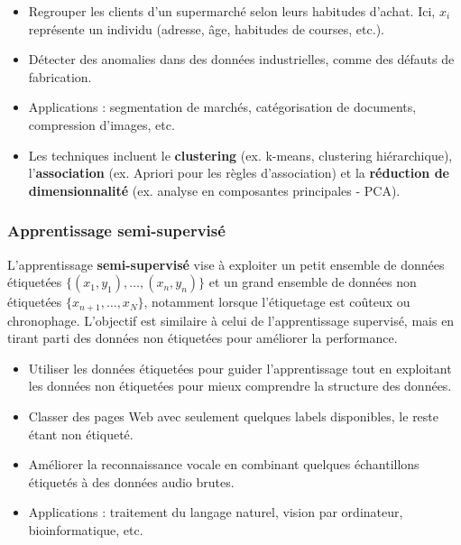 \documentclass[a4paper,14pt]{article}
\begin{document}
        \begin{itemize}
            \item  Regrouper les clients d’un supermarché selon leurs habitudes d’achat. Ici, \(x_i\) représente un individu (adresse, âge, habitudes de courses, etc.).
            \item  Détecter des anomalies dans des données industrielles, comme des défauts de fabrication.
            \item  Applications : segmentation de marchés, catégorisation de documents, compression d’images, etc.
        \end{itemize}
        
        
        \begin{itemize}
            \item Les techniques incluent le \textbf{clustering} (ex. k-means, clustering hiérarchique), l’\textbf{association} (ex. Apriori pour les règles d’association) et la \textbf{réduction de dimensionnalité} (ex. analyse en composantes principales - PCA).
        \end{itemize}
        
        \subsubsection{Apprentissage semi-supervisé}
        
        L'apprentissage \textbf{semi-supervisé} vise à exploiter un petit ensemble de données étiquetées \(\{(x_1, y_1), \ldots, (x_n, y_n)\}\) et un grand ensemble de données non étiquetées \(\{x_{n+1}, \ldots, x_N\}\), notamment lorsque l’étiquetage est coûteux ou chronophage. L’objectif est similaire à celui de l’apprentissage supervisé, mais en tirant parti des données non étiquetées pour améliorer la performance.
        
        
        \begin{itemize}
            \item  Utiliser les données étiquetées pour guider l’apprentissage tout en exploitant les données non étiquetées pour mieux comprendre la structure des données.
        \end{itemize}
        
        
        \begin{itemize}
            \item  Classer des pages Web avec seulement quelques labels disponibles, le reste étant non étiqueté.
            \item  Améliorer la reconnaissance vocale en combinant quelques échantillons étiquetés à des données audio brutes.
            \item  Applications : traitement du langage naturel, vision par ordinateur, bioinformatique, etc.
        \end{itemize}
        
\end{document}
